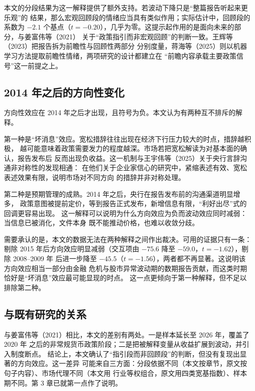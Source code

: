 本文的分段结果为这一解释提供了额外支持。若波动下降只是“整篇报告听起来更乐观”的
结果，那么宏观回顾段的情绪应当具有类似作用；实际估计中，回顾段的系数为 $-2.1$
个基点（$t=-0.20$），几乎为零。这提示起作用的是面向未来的部分，与姜富伟等（2021）
关于“政策指引而非宏观回顾”的判断一致。王辉等（2023）把报告拆为前瞻性与回顾性两部分
分别度量，蒋海等（2025）则以机器学习方法提取前瞻性情绪，两项研究的设计都建立在
“前瞻内容承载主要政策信号”这一前提之上。

\subsection{2014 年之后的方向性变化}

方向性效应在 2014 年之后才出现，且符号为负。本文认为有两种互不排斥的解释。

第一种是“坏消息”效应。宽松措辞往往出现在经济下行压力较大的时点，措辞越积极，
越可能意味着政策需要发力的程度越深。市场若把宽松解读为对基本面的确认，报告发布后
反而出现负收益。这一机制与王宇伟等（2025）关于央行言辞沟通非对称性的发现相通：
在他们关于企业家信心的研究中，紧缩表述有效、宽松表述效果有限，说明市场对不同方向
的措辞并非对称处理。

第二种是预期管理的成熟。2014 年之后，央行在报告发布前的沟通渠道明显增多，
政策意图被提前定价，等到报告正式发布，新增信息有限，“利好出尽”式的回调更容易出现。
这一解释可以说明为什么方向效应为负而波动效应同时减弱：当信息已被消化，文件本身
既不能推动价格，也难以收敛分歧。

需要承认的是，本文的数据无法在两种解释之间作出裁决。可用的证据只有一条：剔除 2015
年后方向效应明显减弱（交互项由 $-75.6$ 降至 $-59.0$，$t=-1.62$），剔除 2008--2009 年
后进一步降至 $-45.5$（$t=-1.56$），两者都不再显著。这说明该方向效应相当一部分由金融
危机与股市异常波动期的数期报告贡献，而这类时期恰好是“坏消息”效应最可能显现的时点。
这一点更倾向于第一种解释，但不足以排除第二种。

\subsection{与既有研究的关系}

与姜富伟等（2021）相比，本文的差别有两处。一是样本延长至 2026 年，覆盖了 2020 年
之后的非常规货币政策阶段；二是把被解释变量从收益扩展到波动，并引入制度断点。
结论上，本文确认了“指引段而非回顾段”的判断，但没有复现出显著的方向效应。这一差异
可能来自三方面：分段依据不同（本文按章节，原文按句子内容）、市场代理不同（本文用
行业等权组合，原文用四类宽基指数）、样本期不同。第 3 章已就第一点作了说明。

